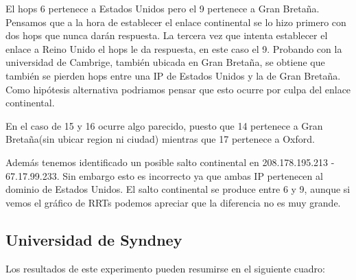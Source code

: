 El hops 6 pertenece a Estados Unidos pero el 9 pertenece a Gran Bretaña. Pensamos que a la hora de
establecer el enlace continental se lo hizo primero con dos hops que nunca darán respuesta. La tercera
vez que intenta establecer el enlace a Reino Unido el hops le da respuesta, en este caso el 9.
Probando con la universidad de Cambrige, también ubicada en Gran Bretaña, se obtiene que también se
pierden hops entre una IP de Estados Unidos y la de Gran Bretaña. Como hipótesis alternativa
podriamos pensar que esto ocurre por culpa del enlace continental.%

En el caso de 15 y 16 ocurre algo parecido, puesto que 14 pertenece a Gran Bretaña(sin ubicar region
ni ciudad) mientras que 17 pertenece a Oxford. 

Además tenemos identificado un posible salto continental en 208.178.195.213 - 67.17.99.233. Sin embargo esto
es incorrecto ya que ambas IP pertenecen al dominio de Estados Unidos. El salto continental se produce entre
6 y 9, aunque si vemos el gráfico de RRTs podemos apreciar que la diferencia no es muy grande.

\newpage

\subsection{Universidad de Syndney}

Los resultados de este experimento pueden resumirse en el siguiente cuadro:

